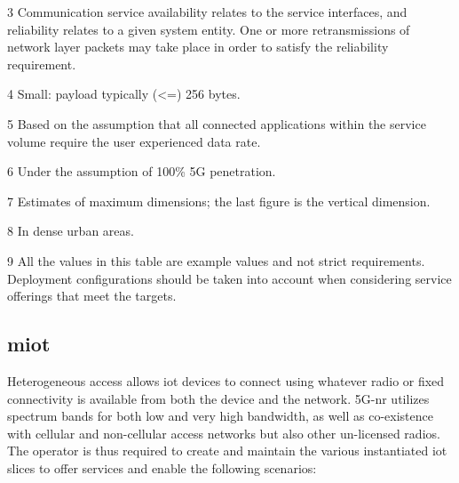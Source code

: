 \begin{sidewaystable*}
\begin{threeparttable}
\begin{tablenotes}
        \item[3] Communication service availability relates to the service interfaces, and reliability relates to a given system entity. One or more retransmissions of network layer packets may take place in order to satisfy the reliability requirement.
        \item[4] Small: payload typically (<=) 256 bytes.
        \item[5] Based on the assumption that all connected applications within the service volume require the user experienced data rate.
        \item[6]  Under the assumption of 100\% 5G penetration.
        \item[7] Estimates of maximum dimensions; the last figure is the vertical dimension.
        \item[8] In dense urban areas.
        \item[9] All the values in this table are example values and not strict requirements. Deployment configurations should be taken into account when considering service offerings that meet the targets.
    \end{tablenotes}

    \end{threeparttable}
    \end{sidewaystable*}

\newpage
    
    \subsection{\acrfull{miot}}
    Heterogeneous access allows \acrshort{iot} devices to connect using whatever radio or fixed connectivity is available from both the device and the network. 5G-\acrshort{nr} utilizes spectrum bands for both low and very high bandwidth, as well as co-existence with cellular and non-cellular access networks but also other un-licensed radios. The operator is thus required to create and maintain the various instantiated \acrshort{iot} slices to offer services and enable the following scenarios:
    
